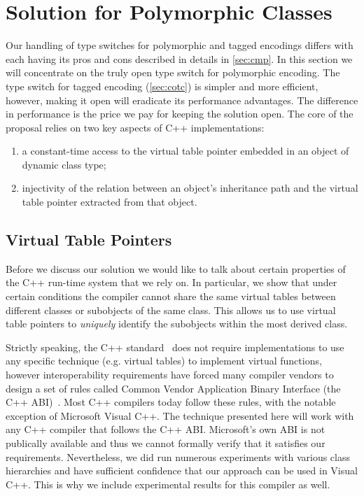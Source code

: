 \documentclass[preprint]{sigplanconf}
\begin{document}
\section{Solution for Polymorphic Classes}
\label{sec:copc}

Our handling of type switches for polymorphic and tagged encodings differs 
with each having its pros and cons described in details in \textsection\ref{sec:cmp}.
In this section we will concentrate on the truly open type switch for 
polymorphic encoding. The type switch for tagged encoding (\textsection\ref{sec:cotc}) 
is simpler and more efficient, however, making it open will eradicate its 
performance advantages. The difference in performance is the price we pay for 
keeping the solution open.  The core of the proposal relies on two key
aspects of C++ implementations:
\begin{enumerate}
\item a constant-time access to the virtual table pointer embedded in an object of
  dynamic class type;
\item injectivity of the relation between an object's inheritance path
  and the virtual table pointer extracted from that object.
\end{enumerate}

\subsection{Virtual Table Pointers}
\label{sec:vtp}

Before we discuss our solution we would like to talk about certain properties of 
the C++ run-time system that we rely on. In particular,
we show that under certain conditions the compiler cannot share 
the same virtual tables between different classes or subobjects of the same 
class. This allows us to use virtual table pointers to \emph{uniquely} identify 
the subobjects within the most derived class.

Strictly speaking, the C++ standard~\cite{C++0x} does not require implementations 
to use any specific technique (e.g. virtual tables) to implement virtual functions, 
however interoperability requirements have forced many compiler vendors to design a 
set of rules called Common Vendor Application Binary Interface (the C++ 
ABI)~\cite{C++ABI}. Most C++ compilers today follow these rules, with the 
notable exception of Microsoft Visual C++. The technique presented here will 
work with any C++ compiler that follows the C++ ABI. Microsoft's own ABI is not 
publically available and thus we cannot formally verify that it satisfies 
our requirements. Nevertheless, we did run numerous experiments with various 
class hierarchies and have sufficient confidence that our approach can be used 
in Visual C++. This is why we include experimental results for this compiler as 
well.
\end{document}
